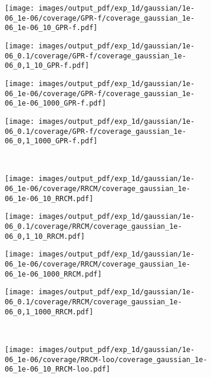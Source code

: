 \documentclass[a4paper,14pt]{extarticle}
\begin{document}
\begin{figure}%
  \centering
  \begin{subfigure}[b]{0.25\linewidth}
    \texttt{[image: images/output\_pdf/exp\_1d/gaussian/1e-06\_1e-06/coverage/GPR-f/coverage\_gaussian\_1e-06\_1e-06\_10\_GPR-f.pdf]}
  \end{subfigure}%
  \begin{subfigure}[b]{0.25\linewidth}
    \texttt{[image: images/output\_pdf/exp\_1d/gaussian/1e-06\_0.1/coverage/GPR-f/coverage\_gaussian\_1e-06\_0,1\_10\_GPR-f.pdf]}
  \end{subfigure}%
  \begin{subfigure}[b]{0.25\linewidth}
    \texttt{[image: images/output\_pdf/exp\_1d/gaussian/1e-06\_1e-06/coverage/GPR-f/coverage\_gaussian\_1e-06\_1e-06\_1000\_GPR-f.pdf]}
  \end{subfigure}%
  \begin{subfigure}[b]{0.25\linewidth}
    \texttt{[image: images/output\_pdf/exp\_1d/gaussian/1e-06\_0.1/coverage/GPR-f/coverage\_gaussian\_1e-06\_0,1\_1000\_GPR-f.pdf]}
  \end{subfigure}\\
  \begin{subfigure}[b]{0.25\linewidth}
    \texttt{[image: images/output\_pdf/exp\_1d/gaussian/1e-06\_1e-06/coverage/RRCM/coverage\_gaussian\_1e-06\_1e-06\_10\_RRCM.pdf]}
  \end{subfigure}%
  \begin{subfigure}[b]{0.25\linewidth}
    \texttt{[image: images/output\_pdf/exp\_1d/gaussian/1e-06\_0.1/coverage/RRCM/coverage\_gaussian\_1e-06\_0,1\_10\_RRCM.pdf]}
  \end{subfigure}%
  \begin{subfigure}[b]{0.25\linewidth}
    \texttt{[image: images/output\_pdf/exp\_1d/gaussian/1e-06\_1e-06/coverage/RRCM/coverage\_gaussian\_1e-06\_1e-06\_1000\_RRCM.pdf]}
  \end{subfigure}%
  \begin{subfigure}[b]{0.25\linewidth}
    \texttt{[image: images/output\_pdf/exp\_1d/gaussian/1e-06\_0.1/coverage/RRCM/coverage\_gaussian\_1e-06\_0,1\_1000\_RRCM.pdf]}
  \end{subfigure}\\
  \begin{subfigure}[b]{0.25\linewidth}
    \texttt{[image: images/output\_pdf/exp\_1d/gaussian/1e-06\_1e-06/coverage/RRCM-loo/coverage\_gaussian\_1e-06\_1e-06\_10\_RRCM-loo.pdf]}

\end{subfigure}
\end{figure}
\end{document}

